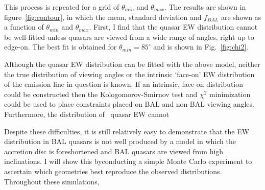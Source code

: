 This process is repeated for a grid of $\theta_{min}$ and $\theta_{max}$. The 
results are shown in figure~\ref{fig:contour}, in which the mean, 
standard deviation and $f_{BAL}$ are shown as a function of $\theta_{min}$ 
and $\theta_{max}$. First, I find that the quasar EW distribution
cannot be well-fitted unless quasars are viewed from a wide range of angles,
right up to edge-on. The best fit is obtained for $\theta_{min}=85^\circ$ and
is shown in Fig.~\ref{fig:chi2}.


Although the quasar EW distribution can be fitted with the above 
model, neither the true distribution of viewing angles 
or the intrinsic `face-on' EW distribution of the emission line in 
question is known. If an intrinsic, face-on distribution could be constructed
then the Kologomorov-Smirnov test and $\chi^2$ minimization could be used
to place constraints placed on BAL and non-BAL viewing angles.
Furthermore, the distribution of \civ\ quasar EW cannot 



Despite these difficulties, it is still relatively easy to 
demonstrate that the EW distribution in BAL quasars is not well produced by a 
model in which the accretion disc is foreshortened 
and BAL quasars are viewed from high inclinations. I will show this byconducting
a simple Monte Carlo experiment to ascertain which geometries best reproduce the observed
distributions. Throughout these simulations, 



